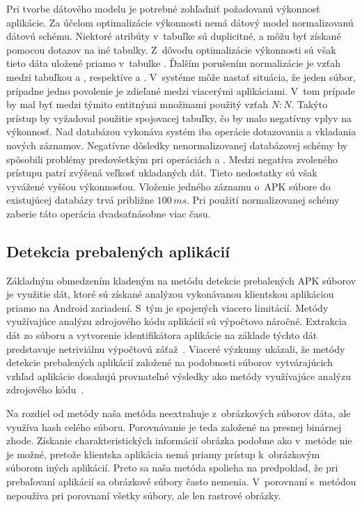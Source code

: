 Pri tvorbe dátového modelu je potrebné zohľadniť požadovanú výkonnosť aplikácie. Za účelom optimalizácie výkonnosti nemá dátový model normalizovanú dátovú schému. Niektoré atribúty v~tabuľke  sú duplicitné, a môžu byť získané pomocou dotazov na iné tabulky. Z~dôvodu optimalizácie výkonnosti sú však tieto dáta uložené priamo v~tabulke .
Ďalším porušením normalizácie je vzťah medzi tabuľkou  a , respektíve  a . V~systéme môže nastať situácia, že jeden súbor, prípadne jedno povolenie je zdieľané medzi viacerými aplikáciami. V~tom prípade by mal byť medzi týmito entitnými množinami použitý vzťah $N : N$. Takýto prístup by vyžadoval použitie spojovacej tabuľky, čo by malo negatívny vplyv na výkonnosť. Nad databázou vykonáva systém  iba operácie dotazovania a vkladania nových záznamov. Negatívne dôsledky nenormalizovanej databázovej schémy by spôsobili problémy predovšetkým pri operáciách  a . Medzi negatíva zvoleného prístupu patrí zvýšená veľkosť ukladaných dát. Tieto nedostatky sú však vyvážené vyššou výkonnosťou. Vloženie jedného záznamu o~APK súbore do existujúcej databázy trvá približne $100\, ms$. Pri použití normalizovanej schémy zaberie táto operácia dvadsaťnásobne viac času.  

\subsection{Detekcia prebalených aplikácií}

Základným obmedzením kladeným na metódu detekcie prebalených APK súborov je využitie dát, ktoré sú získané analýzou vykonávanou klientskou aplikáciou priamo na Android zariadení. S~tým je spojených viacero limitácií. 
Metódy využívajúce analýzu zdrojového kódu aplikácií sú výpočtovo náročné. Extrakcia dát zo súboru  a vytvorenie identifikátora aplikácie na základe týchto dát predstavuje netriviálnu výpočtovú záťaž~\cite{Zhou2012b}. Viaceré výzkumy ukázali, že metódy detekcie prebalených aplikácií založené na podobnosti súborov vytvárajúcich vzhľad aplikácie dosahujú provnateľné výsledky ako metódy využívajúce analýzu zdrojového kódu~\cite{Gadyatskaya2016,Zhauniarovich2014, ImageStruct}.

Na rozdiel od metódy  naša metóda neextrahuje z~obrázkových súborov dáta, ale využíva hash celého súboru. Porovnávanie je teda založené na presnej binárnej zhode. Získanie charakteristických informácií obrázka podobne ako v~metóde  nie je možné, pretože klientska aplikácia nemá priamy prístup k~obrázkovým súborom iných aplikácií. Preto sa naša metóda spolieha na predpoklad, že pri prebaľovaní aplikácií sa obrázkové súbory často nemenia. 
V~porovnaní s~metódou  nepoužíva  pri porovnaní všetky súbory, ale len rastrové obrázky.

